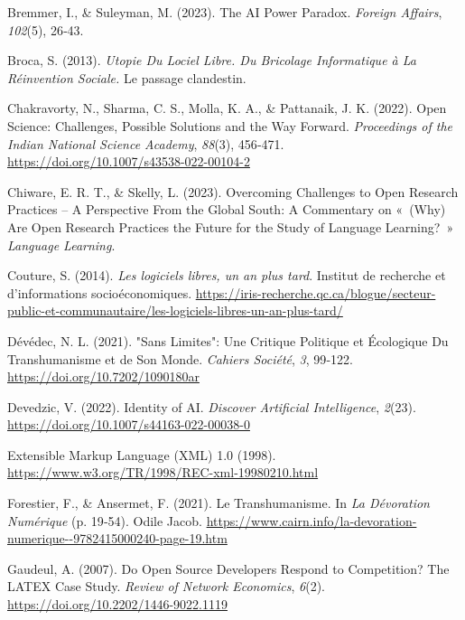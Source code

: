 \documentclass[
  letterpaper,
  DIV=11,
  numbers=noendperiod]{scrreprt}
\newlength{\cslhangindent}
\newenvironment{CSLReferences}[2] %
 {\begin{list}{}{%
  \setlength{\itemindent}{0pt}
  \setlength{\leftmargin}{0pt}
  \setlength{\parsep}{0pt}
  \ifodd #1
   \setlength{\leftmargin}{\cslhangindent}
   \setlength{\itemindent}{-1\cslhangindent}
  \fi
  \setlength{\itemsep}{#2\baselineskip}}}
 {\end{list}}
\begin{document}
\begin{CSLReferences}{1}{0}
Bremmer, I., \& Suleyman, M. (2023). The {AI Power Paradox}.
\emph{Foreign Affairs}, \emph{102}(5), 26‑43.

Broca, S. (2013). \emph{Utopie Du Lociel Libre. {Du} Bricolage
Informatique à La Réinvention Sociale.} Le passage clandestin.

Chakravorty, N., Sharma, C. S., Molla, K. A., \& Pattanaik, J. K.
(2022). Open {Science}: {Challenges}, {Possible Solutions} and the {Way
Forward}. \emph{Proceedings of the Indian National Science Academy},
\emph{88}(3), 456‑471. \url{https://doi.org/10.1007/s43538-022-00104-2}

Chiware, E. R. T., \& Skelly, L. (2023). Overcoming {Challenges} to
{Open Research Practices} -- {A Perspective From} the {Global South}: {A
Commentary} on {«~({Why}) {Are Open Research Practices} the {Future} for
the {Study} of {Language Learning}?~»} \emph{Language Learning}.

Couture, S. (2014). \emph{Les logiciels libres, un an plus tard}.
Institut de recherche et d'informations socioéconomiques.
\url{https://iris-recherche.qc.ca/blogue/secteur-public-et-communautaire/les-logiciels-libres-un-an-plus-tard/}

Dévédec, N. L. (2021). "{Sans} Limites": Une Critique Politique et
Écologique Du Transhumanisme et de Son Monde. \emph{Cahiers Société},
\emph{3}, 99‑122. \url{https://doi.org/10.7202/1090180ar}

Devedzic, V. (2022). Identity of {AI}. \emph{Discover Artificial
Intelligence}, \emph{2}(23).
\url{https://doi.org/10.1007/s44163-022-00038-0}

Extensible {Markup Language} ({XML}) 1.0 (1998).
\url{https://www.w3.org/TR/1998/REC-xml-19980210.html}

Forestier, F., \& Ansermet, F. (2021). Le Transhumanisme. In \emph{La
{Dévoration Numérique}} (p. 19‑54). Odile Jacob.
\url{https://www.cairn.info/la-devoration-numerique--9782415000240-page-19.htm}

Gaudeul, A. (2007). Do {Open Source Developers Respond} to
{Competition}? {The LATEX Case Study}. \emph{Review of Network
Economics}, \emph{6}(2). \url{https://doi.org/10.2202/1446-9022.1119}


\end{CSLReferences}
\end{document}
